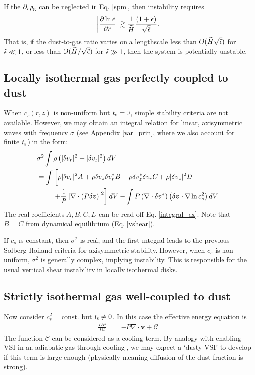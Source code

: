 If the $\partial_r\rho_\mathrm{g}$ can be neglected in Eq. \ref{spm}, then instability
requires 
\begin{align}
  \left|\frac{\partial\ln{\tilde{\epsilon}}}{\partial r}\right| \gtrsim
  \frac{1}{\widetilde{H}}\frac{\left(1+\tilde{\epsilon}\right)}{\sqrt{\tilde{\epsilon}}}. 
\end{align}
That is, if the dust-to-gas ratio varies on a lengthscale less than
$O(\widetilde{H}\sqrt{\tilde{\epsilon}})$ for $\tilde{\epsilon}\ll 1$, or less than
$O(\widetilde{H}/\sqrt{\tilde{\epsilon}})$ for $\tilde{\epsilon}\gg 1$, then the system is
potentially unstable.   



\subsection{Locally isothermal gas perfectly coupled to dust} 
When $c_s(r,z)$ is non-uniform but $t_\mathrm{s}=0$, simple stability
criteria are not available. However, we may obtain an integral
relation for linear, axisymmetric waves with frequency $\sigma$ (see
Appendix \ref{var_prin}, where we also account for finite $t_\mathrm{s}$) in
the form:   
\begin{align}
&  \sigma^2\int\rho\left(|\dd v_r|^2 + |\dd v_z|^2\right)dV \notag\\
&= \int\left[ \rho
  |\dd v_r|^2A + \rho  \dd v_z \dd v_r^* B + \rho \dd v_z^*\dd v_r C +
  \rho |\dd v_z|^2 D\phantom{\frac{1}{1}}\right. \notag\\
&\phantom{===}  \left. + \frac{1}{P}\left|\nabla\cdot\left(P\dd
  \bm{v}\right)\right|^2\right]dV - \int P
  \left(\nabla\cdot\dd\bm{v}^*\right)\left(\dd\bm{v}\cdot\nabla\ln{c_s^2}\right)dV.
\end{align}
The real coefficients $A,B,C,D$ can be read off
Eq. \ref{integral_ex}. Note that $B=C$ from dynamical equilibrium
(Eq. \ref{vshear}).   

If $c_s$ is constant, then $\sigma^2$ is real, and 
the first integral leads to the previous Solberg-Hoiland criteria for 
axisymmetric stability. However, when $c_s$ is non-uniform, $\sigma^2$ 
is generally complex, implying instability. This is responsible for 
the usual vertical shear instability in locally isothermal disks. 

\subsection{Strictly isothermal gas well-coupled to dust} 
Now consider $c_s^2=\mathrm{const.}$ but $t_\mathrm{s}\neq0$. In this case 
the effective energy equation is 
\begin{align}\label{dusty_cooling}
  \frac{DP}{Dt} &= - P \nabla \cdot \bm{v} + \mathcal{C}
\end{align} 
The function $\mathcal{C}$ can be considered as a cooling term. By
analogy with enabling VSI in an adiabatic gas through cooling
\citep{nelson13,lin15}, we may expect a `dusty VSI' to develop 
if this term is large enough (physically meaning diffusion of the
dust-fraction is strong). 

